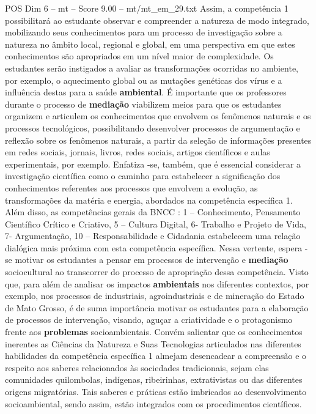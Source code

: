 \begin{textsample}{POS Dim 6 – mt – Score 9.00 – mt/mt\_em\_29.txt}
Assim, a competência 1 possibilitará ao estudante observar e compreender a natureza de modo integrado, mobilizando seus conhecimentos para um processo de investigação sobre a natureza no âmbito local, regional e global, em uma perspectiva em que estes conhecimentos são apropriados em um nível maior de complexidade.
Os estudantes serão instigados a avaliar as transformações ocorridas no ambiente, por exemplo, o aquecimento global ou as mutações genéticas dos vírus e a influência destas para a saúde \textbf{ambiental}.
É importante que os professores durante o processo de \textbf{mediação} viabilizem meios para que os estudantes organizem e articulem os conhecimentos que envolvem os fenômenos naturais e os processos tecnológicos, possibilitando desenvolver processos de argumentação e reflexão sobre os fenômenos naturais, a partir da seleção de informações presentes em redes sociais, jornais, livros, redes sociais, artigos científicos e aulas experimentais, por exemplo.
Enfatiza -se, também, que é essencial considerar a investigação científica como o caminho para estabelecer a significação dos conhecimentos referentes aos processos que envolvem a evolução, as transformações da matéria e energia, abordados na competência específica 1.
Além disso, as competências gerais da BNCC : 1 – Conhecimento, Pensamento Científico Crítico e Criativo, 5 – Cultura Digital, 6- Trabalho e Projeto de Vida, 7- Argumentação, 10 – Responsabilidade e Cidadania estabelecem uma relação dialógica mais próxima com esta competência específica.
Nessa vertente, espera -se motivar os estudantes a pensar em processos de intervenção e \textbf{mediação} sociocultural ao transcorrer do processo de apropriação dessa competência.
Visto que, para além de analisar os impactos \textbf{ambientais} nos diferentes contextos, por exemplo, nos processos de industriais, agroindustriais e de mineração do Estado de Mato Grosso, é de suma importância motivar os estudantes para a elaboração de processos de intervenção, visando, aguçar a criatividade e o protagonismo frente aos \textbf{problemas} socioambientais.
Convém salientar que os conhecimentos inerentes as Ciências da Natureza e Suas Tecnologias articulados nas diferentes habilidades da competência específica 1 almejam desencadear a compreensão e o respeito aos saberes relacionados às sociedades tradicionais, sejam elas comunidades quilombolas, indígenas, ribeirinhas, extrativistas ou das diferentes origens migratórias.
Tais saberes e práticas estão imbricados ao desenvolvimento socioambiental, sendo assim, estão integrados com os procedimentos científicos.

\end{textsample}
